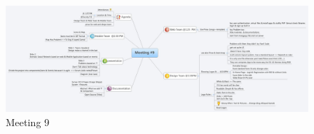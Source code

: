 \documentclass[12pt,a4paper,class,twoside,openany]{report}
\begin{document}
\begin{figure}
\begin{center}
\includegraphics[angle=90, width=5 in,height=8 in]{2-8}
\caption{Meeting 9}
\label{fg:2-8}
\end{center}
\end{figure}
\end{document}
